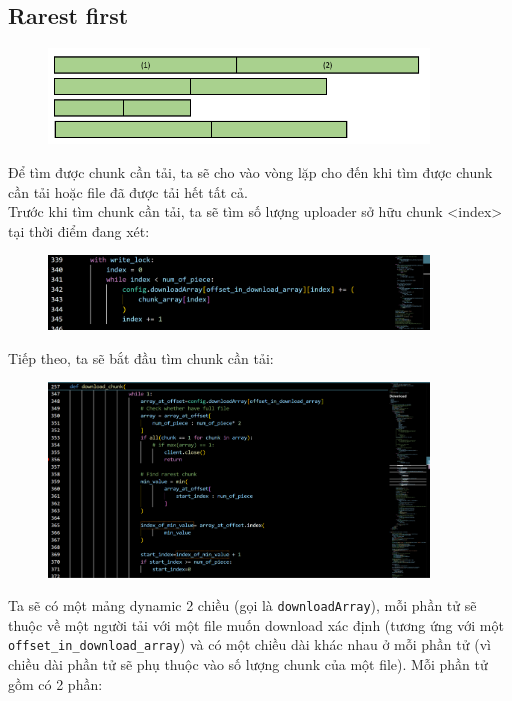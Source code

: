\documentclass[a4paper]{article}
\begin{document}
\subsection{Rarest first}
\begin{figure}[H]
    \centering
    \includegraphics[width=0.9\textwidth]{images/40.png}
    \captionsetup{labelformat=empty}
\end{figure}
Để tìm được chunk cần tải, ta sẽ cho vào vòng lặp cho đến khi tìm được chunk cần tải hoặc file đã được tải hết tất cả. \\
Trước khi tìm chunk cần tải, ta sẽ tìm số lượng uploader sở hữu chunk <index> tại thời điểm đang xét:
\begin{figure}[H]
    \centering
    \includegraphics[width=0.9\textwidth]{images/1.png}
    \captionsetup{labelformat=empty}
\end{figure}
Tiếp theo, ta sẽ bắt đầu tìm chunk cần tải:
\begin{figure}[H]
    \centering
    \includegraphics[width=0.9\textwidth]{images/2.png}
    \captionsetup{labelformat=empty}
\end{figure}
Ta sẽ có một mảng dynamic 2 chiều (gọi là \texttt{downloadArray}), mỗi phần tử sẽ thuộc về một người tải với một file muốn download xác định (tương ứng với một \texttt{offset\_in\_download\_array}) và có một chiều dài khác nhau ở mỗi phần tử (vì chiều dài phần tử sẽ phụ thuộc vào số lượng chunk của một file). Mỗi phần tử gồm có 2 phần: 
\end{document}
